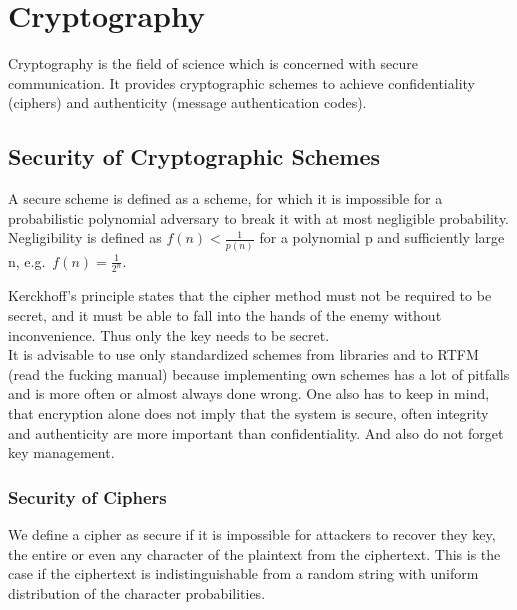 
\section{Cryptography}
Cryptography is the field of science which is concerned with secure communication.
It provides cryptographic schemes to achieve confidentiality (ciphers) and authenticity (message authentication codes).

\subsection{Security of Cryptographic Schemes}
A secure scheme is defined as a scheme, for which it is impossible for a probabilistic polynomial adversary to break it with at most negligible probability.
Negligibility is defined as $f(n) < \frac{1}{p(n)}$ for a polynomial p and sufficiently large n, e.g.\ $f(n) = \frac{1}{2^n}$.

Kerckhoff's principle states that the cipher method must not be required to be secret, and it must be able to fall into the hands of the enemy without inconvenience.
Thus only the key needs to be secret.\\

It is advisable to use only standardized schemes from libraries and to RTFM (read the fucking manual) because implementing own schemes has a lot of pitfalls and is more often or almost always done wrong.
One also has to keep in mind, that encryption alone does not imply that the system is secure, often integrity and authenticity are more important than confidentiality.
And also do not forget key management.

\subsubsection*{Security of Ciphers}
We define a cipher as secure if it is impossible for attackers to recover they key, the entire or even any character of the plaintext from the ciphertext.
This is the case if the ciphertext is indistinguishable from a random string with uniform distribution of the character probabilities.

